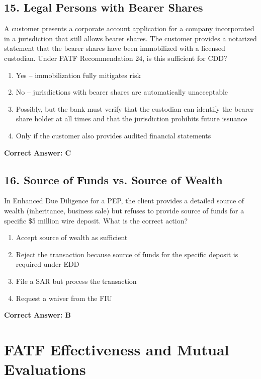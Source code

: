 \documentclass[11pt,a4paper]{article}
\begin{document}
	\subsection{15. Legal Persons with Bearer Shares}
	A customer presents a corporate account application for a company incorporated in a jurisdiction that still allows bearer shares. The customer provides a notarized statement that the bearer shares have been immobilized with a licensed custodian. Under FATF Recommendation 24, is this sufficient for CDD?
	\begin{enumerate}[label=\Alph*.]
		\item Yes – immobilization fully mitigates risk
		\item No – jurisdictions with bearer shares are automatically unacceptable
		\item Possibly, but the bank must verify that the custodian can identify the bearer share holder at all times and that the jurisdiction prohibits future issuance
		\item Only if the customer also provides audited financial statements
	\end{enumerate}
	\textbf{Correct Answer: C}
	
	\subsection{16. Source of Funds vs. Source of Wealth}
	In Enhanced Due Diligence for a PEP, the client provides a detailed source of wealth (inheritance, business sale) but refuses to provide source of funds for a specific \$5 million wire deposit. What is the correct action?
	\begin{enumerate}
		\item Accept source of wealth as sufficient
		\item Reject the transaction because source of funds for the specific deposit is required under EDD
		\item File a SAR but process the transaction
		\item Request a waiver from the FIU
	\end{enumerate}
	\textbf{Correct Answer: B}
	
	\section{FATF Effectiveness and Mutual Evaluations}
	
\end{document}
